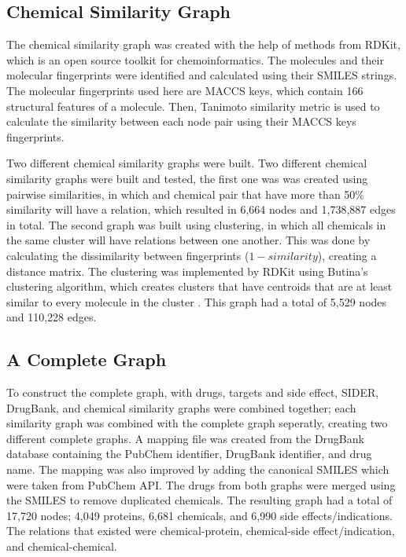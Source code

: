 \subsection{Chemical Similarity Graph}
The chemical similarity graph was created with the help of methods from RDKit, which is an open source toolkit for chemoinformatics. The molecules and their molecular fingerprints were identified and calculated using their \ac{SMILES} strings. The molecular fingerprints used here are MACCS keys, which contain 166 structural features of a molecule. Then, Tanimoto similarity metric is used to calculate the similarity between each node pair using their MACCS keys fingerprints. 

Two different chemical similarity graphs were built. Two different chemical similarity graphs were built and tested, the first one was was created using pairwise similarities, in which and chemical pair that have more than 50\% similarity will have a relation, which resulted in 6,664 nodes and 1,738,887 edges in total. The second graph was built using clustering, in which all chemicals in the same cluster will have relations between one another. This was done by calculating the dissimilarity between fingerprints ($1 - similarity$), creating a distance matrix. The clustering was implemented by RDKit using Butina's clustering algorithm, which creates clusters that have centroids that are at least similar to every molecule in the cluster \cite{butina_unsupervised_1999}. This graph had a total of 5,529 nodes and 110,228 edges.

\subsection{A Complete Graph}
To construct the complete graph, with drugs, targets and side effect, \ac{SIDER}, DrugBank, and chemical similarity graphs were combined together; each similarity graph was combined with the complete graph seperatly, creating two different complete graphs. A mapping file was created from the DrugBank database containing the PubChem identifier, DrugBank identifier, and drug name. The mapping was also improved by adding the canonical \ac{SMILES} which were taken from PubChem API. The drugs from both graphs were merged using the SMILES to remove duplicated chemicals. The resulting graph had a total of 17,720 nodes; 4,049 proteins, 6,681 chemicals, and 6,990 side effects/indications. The relations that existed were chemical-protein, chemical-side effect/indication, and chemical-chemical.

